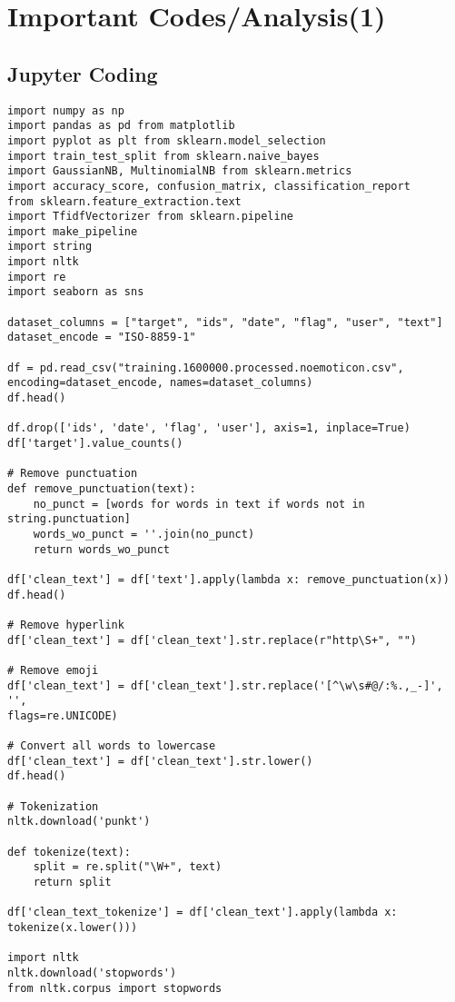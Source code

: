 \chapter{Important Codes/Analysis(1)}
\section{Jupyter Coding}
\lstset{language=Python}
\lstset{frame=lines}
\lstset{basicstyle=\footnotesize}
\begin{lstlisting}
import numpy as np
import pandas as pd from matplotlib 
import pyplot as plt from sklearn.model_selection 
import train_test_split from sklearn.naive_bayes 
import GaussianNB, MultinomialNB from sklearn.metrics 
import accuracy_score, confusion_matrix, classification_report 
from sklearn.feature_extraction.text 
import TfidfVectorizer from sklearn.pipeline 
import make_pipeline
import string
import nltk
import re
import seaborn as sns

dataset_columns = ["target", "ids", "date", "flag", "user", "text"]
dataset_encode = "ISO-8859-1"

df = pd.read_csv("training.1600000.processed.noemoticon.csv",
encoding=dataset_encode, names=dataset_columns)
df.head()

df.drop(['ids', 'date', 'flag', 'user'], axis=1, inplace=True)
df['target'].value_counts()

# Remove punctuation
def remove_punctuation(text):
    no_punct = [words for words in text if words not in string.punctuation]
    words_wo_punct = ''.join(no_punct)
    return words_wo_punct

df['clean_text'] = df['text'].apply(lambda x: remove_punctuation(x))
df.head()

# Remove hyperlink
df['clean_text'] = df['clean_text'].str.replace(r"http\S+", "")

# Remove emoji
df['clean_text'] = df['clean_text'].str.replace('[^\w\s#@/:%.,_-]', '',
flags=re.UNICODE)

# Convert all words to lowercase
df['clean_text'] = df['clean_text'].str.lower()
df.head()

# Tokenization
nltk.download('punkt')

def tokenize(text):
    split = re.split("\W+", text)
    return split

df['clean_text_tokenize'] = df['clean_text'].apply(lambda x: tokenize(x.lower()))

import nltk
nltk.download('stopwords')
from nltk.corpus import stopwords


\end{lstlisting}
